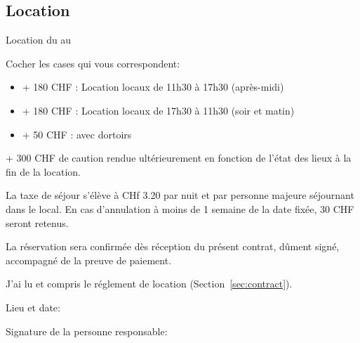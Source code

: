 \documentclass[a4paper,12pt]{extarticle}
\begin{document}
\subsection*{Location}

Location du  au 

Cocher les cases qui vous correspondent:

\begin{itemize}
    \item[]  + 180 CHF : Location locaux de 11h30 à 17h30 (après-midi)
    \item[]  + 180 CHF : Location locaux de 17h30 à 11h30 (soir et matin)
    \item[]  + 50 CHF : avec dortoirs
\end{itemize}

+ 300 CHF de caution rendue ultérieurement en fonction de l'état des lieux à la fin de la location.

La taxe de séjour s'élève à CHf 3.20 par nuit et par personne majeure séjournant dans le local.
En cas d'annulation à moins de 1 semaine de la date fixée, 30 CHF seront retenus.

La réservation sera confirmée dès réception du présent contrat, dûment signé, accompagné de la preuve de paiement.


 J'ai lu et compris le réglement de location (Section~\ref{sec:contract}).


Lieu et date: 

Signature de la personne responsable: \hrulefill
\end{document}
